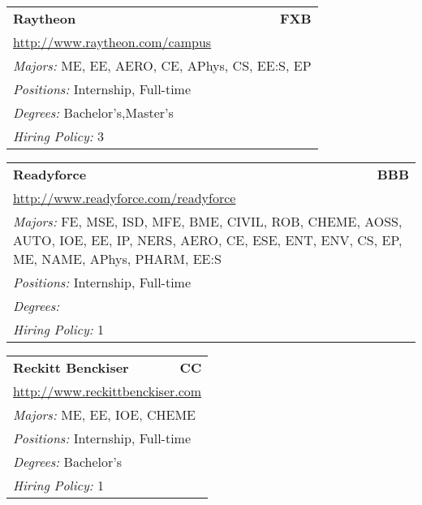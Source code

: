 \documentclass[twoside]{article}
\begin{document}
\begin{center}
\begin{multicols}{3}
\begin{FlushLeft}
\begin{minipage}{\columnwidth}
\end{minipage}
 
\begin{minipage}{\columnwidth}\begin{tabularx}{.95\columnwidth}{Xr}
                 {\Large\bf Raytheon} & {\Large\bf FXB}\\
    \multicolumn{2}{p{.95\columnwidth}}{\url{http://www.raytheon.com/campus}}\\
    \multicolumn{2}{p{.95\columnwidth}}{\emph{Majors:} ME, EE, AERO, CE, APhys, CS, EE:S, EP}\\
    \multicolumn{2}{p{.95\columnwidth}}{\emph{Positions:} Internship, Full-time}\\
    \multicolumn{2}{p{.95\columnwidth}}{\emph{Degrees:} Bachelor's,Master's}\\
    \multicolumn{2}{p{.95\columnwidth}}{\emph{Hiring Policy:} 3}\\
    \end{tabularx}
    
\end{minipage}
 
\begin{minipage}{\columnwidth}\begin{tabularx}{.95\columnwidth}{Xr}
                 {\Large\bf Readyforce} & {\Large\bf BBB}\\
    \multicolumn{2}{p{.95\columnwidth}}{\url{http://www.readyforce.com/readyforce}}\\
    \multicolumn{2}{p{.95\columnwidth}}{\emph{Majors:} FE, MSE, ISD, MFE, BME, CIVIL, ROB, CHEME, AOSS, AUTO, IOE, EE, IP, NERS, AERO, CE, ESE, ENT, ENV, CS, EP, ME, NAME, APhys, PHARM, EE:S}\\
    \multicolumn{2}{p{.95\columnwidth}}{\emph{Positions:} Internship, Full-time}\\
    \multicolumn{2}{p{.95\columnwidth}}{\emph{Degrees:} }\\
    \multicolumn{2}{p{.95\columnwidth}}{\emph{Hiring Policy:} 1}\\
    \end{tabularx}
    
\end{minipage}
 
\begin{minipage}{\columnwidth}\begin{tabularx}{.95\columnwidth}{Xr}
                 {\Large\bf Reckitt Benckiser} & {\Large\bf CC}\\
    \multicolumn{2}{p{.95\columnwidth}}{\url{http://www.reckittbenckiser.com}}\\
    \multicolumn{2}{p{.95\columnwidth}}{\emph{Majors:} ME, EE, IOE, CHEME}\\
    \multicolumn{2}{p{.95\columnwidth}}{\emph{Positions:} Internship, Full-time}\\
    \multicolumn{2}{p{.95\columnwidth}}{\emph{Degrees:} Bachelor's}\\
    \multicolumn{2}{p{.95\columnwidth}}{\emph{Hiring Policy:} 1}\\
    \end{tabularx}
    

\end{minipage}
\end{FlushLeft}
\end{multicols}
\end{center}
\end{document}
